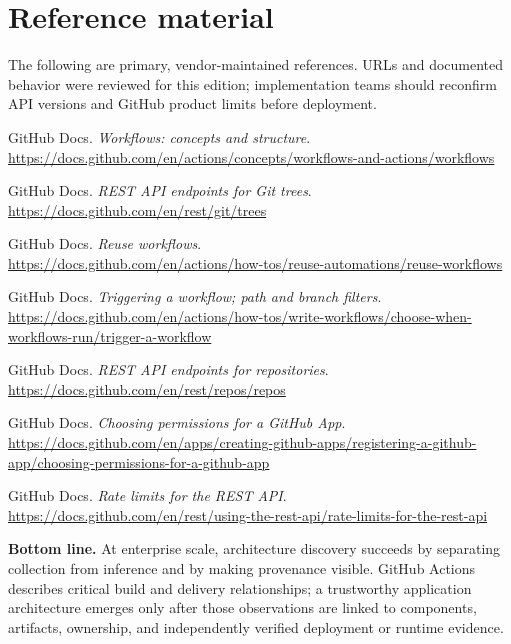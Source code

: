 \documentclass[11pt,letterpaper]{article}
\begin{document}
\section{Reference material}
The following are primary, vendor-maintained references. URLs and documented behavior were reviewed for this edition; implementation teams should reconfirm API versions and GitHub product limits before deployment.

\begingroup\small
\begin{enumerate}[label={[\arabic*]},leftmargin=2.2em,itemsep=8pt]
\item\label{ref:1} GitHub Docs. \emph{Workflows: concepts and structure}.\\\url{https://docs.github.com/en/actions/concepts/workflows-and-actions/workflows}
\item\label{ref:2} GitHub Docs. \emph{REST API endpoints for Git trees}.\\\url{https://docs.github.com/en/rest/git/trees}
\item\label{ref:3} GitHub Docs. \emph{Reuse workflows}.\\\url{https://docs.github.com/en/actions/how-tos/reuse-automations/reuse-workflows}
\item\label{ref:4} GitHub Docs. \emph{Triggering a workflow; path and branch filters}.\\\url{https://docs.github.com/en/actions/how-tos/write-workflows/choose-when-workflows-run/trigger-a-workflow}
\item\label{ref:5} GitHub Docs. \emph{REST API endpoints for repositories}.\\\url{https://docs.github.com/en/rest/repos/repos}
\item\label{ref:6} GitHub Docs. \emph{Choosing permissions for a GitHub App}.\\\url{https://docs.github.com/en/apps/creating-github-apps/registering-a-github-app/choosing-permissions-for-a-github-app}
\item\label{ref:7} GitHub Docs. \emph{Rate limits for the REST API}.\\\url{https://docs.github.com/en/rest/using-the-rest-api/rate-limits-for-the-rest-api}
\end{enumerate}
\endgroup

\begin{keypoint}
\textbf{Bottom line.} At enterprise scale, architecture discovery succeeds by separating collection from inference and by making provenance visible. GitHub Actions describes critical build and delivery relationships; a trustworthy application architecture emerges only after those observations are linked to components, artifacts, ownership, and independently verified deployment or runtime evidence.
\end{keypoint}
\end{document}
